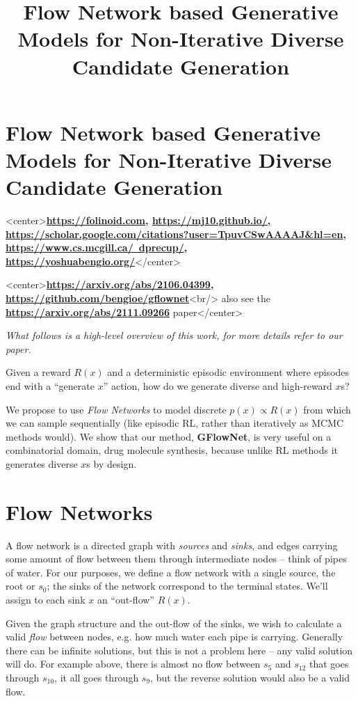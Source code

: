 
\title{Flow Network based Generative Models for Non-Iterative Diverse Candidate Generation}
\section{Flow Network based Generative Models for Non-Iterative Diverse Candidate Generation}
<center>\textbf{\href{Emmanuel Bengio}{https://folinoid.com}, \href{Moksh Jain}{https://mj10.github.io/}, \href{Maksym Korablyov}{https://scholar.google.com/citations?user=TpuvCSwAAAAJ&hl=en}, \href{Doina Precup}{https://www.cs.mcgill.ca/~dprecup/}, \href{Yoshua Bengio}{https://yoshuabengio.org/}}</center>


<center>\textbf{\href{arXiv preprint}{https://arxiv.org/abs/2106.04399}, \href{code}{https://github.com/bengioe/gflownet}}<br/> also see the \textbf{\href{GFlowNet Foundations}{https://arxiv.org/abs/2111.09266}} paper</center>

\emph{What follows is a high-level overview of this work, for more details refer to our paper.}

Given a reward $R(x)$ and a deterministic episodic environment where episodes end with a ``generate $x$'' action, how do we generate diverse and high-reward $x$s?

We propose to use \emph{Flow Networks} to model discrete $p(x) \propto R(x)$ from which we can sample sequentially (like episodic RL, rather than iteratively as MCMC methods would). We show that our method, \textbf{GFlowNet}, is very useful on a combinatorial domain, drug molecule synthesis, because unlike RL methods it generates diverse $x$s by design.

\section{Flow Networks}

A flow network is a directed graph with \emph{sources} and \emph{sinks}, and edges carrying some amount of flow between them through intermediate nodes -- think of pipes of water. For our purposes, we define a flow network with a single source, the root or $s_0$; the sinks of the network correspond to the terminal states. We'll assign to each sink $x$ an ``out-flow'' $R(x)$. 



Given the graph structure and the out-flow of the sinks, we wish to calculate a valid \emph{flow} between nodes, e.g. how much water each pipe is carrying. Generally there can be infinite solutions, but this is not a problem here -- any valid solution will do. For example above, there is almost no flow between $s_5$ and $s_{12}$ that goes through $s_{10}$, it all goes through $s_9$, but the reverse solution would also be a valid flow.

